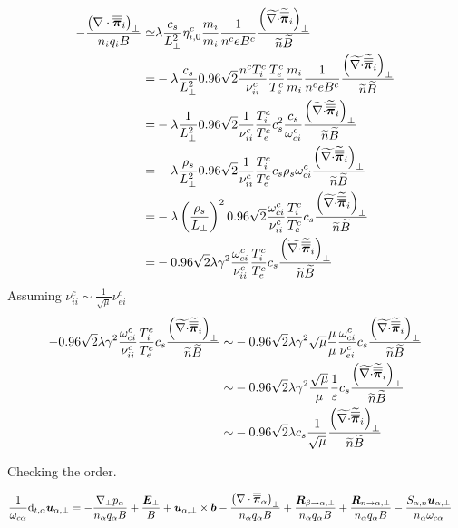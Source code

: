 \begin{align*}
    - \frac{ \left(\nabla\cdot\boldsymbol{\overline{\overline{\pi}}}_i\right)_\perp }{n_i  q_i B}
\simeq&
\lambda
\frac{c_s}{L_{\perp}^2}
\eta^c_{i,0}
\frac{m_i}{m_i}
\frac{1}{n^c  e B^c}
\frac{\left(\widetilde{ \nabla\cdot}\widetilde{ \boldsymbol{\overline{\overline{\pi}}}}_i\right)_\perp}{\widetilde{ n}\widetilde{ B}}
\\
=&
-
\lambda
\frac{c_s}{L_{\perp}^2}
0.96\sqrt{2}\frac{n^cT_i^c}{\nu^c_{ii}}
\frac{T_e^c}{T_e^c}
\frac{m_i}{m_i}
\frac{1}{n^c  e B^c}
\frac{\left(\widetilde{ \nabla\cdot}\widetilde{ \boldsymbol{\overline{\overline{\pi}}}}_i\right)_\perp}{\widetilde{ n}\widetilde{ B}}
\\
=&
-
\lambda
\frac{1}{L_{\perp}^2}
0.96\sqrt{2}\frac{1}{\nu^c_{ii}}
\frac{T_i^c}{T_e^c}
c_s^2
\frac{c_s}{\omega^c_{ci}}
\frac{\left(\widetilde{ \nabla\cdot}\widetilde{ \boldsymbol{\overline{\overline{\pi}}}}_i\right)_\perp}{\widetilde{ n}\widetilde{ B}}
\\
=&
-
\lambda
\frac{\rho_s}{L_{\perp}^2}
0.96\sqrt{2}\frac{1}{\nu^c_{ii}}
\frac{T_i^c}{T_e^c}
c_s\rho_s\omega^c_{ci}
\frac{\left(\widetilde{ \nabla\cdot}\widetilde{ \boldsymbol{\overline{\overline{\pi}}}}_i\right)_\perp}{\widetilde{ n}\widetilde{ B}}
\\
=&
-
\lambda
\left(\frac{\rho_s}{L_{\perp}}\right)^2
0.96\sqrt{2}\frac{\omega^c_{ci}}{\nu^c_{ii}}
\frac{T_i^c}{T_e^c}
c_s
\frac{\left(\widetilde{ \nabla\cdot}\widetilde{ \boldsymbol{\overline{\overline{\pi}}}}_i\right)_\perp}{\widetilde{ n}\widetilde{ B}}
\\
=&
-
0.96\sqrt{2}
\lambda
\gamma^2
\frac{\omega^c_{ci}}{\nu^c_{ii}}
\frac{T_i^c}{T_e^c}
c_s
\frac{\left(\widetilde{ \nabla\cdot}\widetilde{ \boldsymbol{\overline{\overline{\pi}}}}_i\right)_\perp}{\widetilde{ n}\widetilde{ B}}
\end{align*}
%
Assuming $\nu^c_{ii}\sim\frac{1}{\sqrt{\mu}}\nu^c_{ei}$
%
\begin{align*}
-
0.96\sqrt{2}
\lambda
\gamma^2
\frac{\omega^c_{ci}}{\nu^c_{ii}}
\frac{T_i^c}{T_e^c}
c_s
\frac{\left(\widetilde{ \nabla\cdot}\widetilde{ \boldsymbol{\overline{\overline{\pi}}}}_i\right)_\perp}{\widetilde{ n}\widetilde{ B}}
\sim&
-
0.96\sqrt{2}
\lambda
\gamma^2
\sqrt{\mu}
\frac{\mu}{\mu}
\frac{\omega^c_{ci}}{\nu^c_{ei}}
c_s
\frac{\left(\widetilde{ \nabla\cdot}\widetilde{ \boldsymbol{\overline{\overline{\pi}}}}_i\right)_\perp}{\widetilde{ n}\widetilde{ B}}
\\
\sim&
-
0.96\sqrt{2}
\lambda
\gamma^2
\frac{\sqrt{\mu}}{\mu}
\frac{1}{\varepsilon}
c_s
\frac{\left(\widetilde{ \nabla\cdot}\widetilde{ \boldsymbol{\overline{\overline{\pi}}}}_i\right)_\perp}{\widetilde{ n}\widetilde{ B}}
\\
\sim&
-
0.96\sqrt{2}
\lambda
c_s
\frac{1}{\sqrt{\mu}}
\frac{\left(\widetilde{ \nabla\cdot}\widetilde{ \boldsymbol{\overline{\overline{\pi}}}}_i\right)_\perp}{\widetilde{ n}\widetilde{ B}}
\end{align*}
%

Checking the order.


%
\begin{align*}
 \frac{1}{\omega_{c\alpha}}\text{d}_{t,\alpha} \boldsymbol{u}_{\alpha,\perp}
 &=
 -
 \frac{
   \nabla_\perp p_\alpha
 }{n_\alpha  q_\alpha B}
 +
 \frac{\boldsymbol{E}_\perp}{B}
 +
 \boldsymbol{u}_{\alpha,\perp}\times\boldsymbol{b}
 -
  \frac{
   \left(\nabla\cdot\boldsymbol{\overline{\overline{\pi}}}_\alpha\right)_\perp
 }{n_\alpha  q_\alpha B}
 +
 \frac{
   \boldsymbol{R}_{\beta \to \alpha,\perp}
 }{n_\alpha q_\alpha B}
 +
 \frac{
   \boldsymbol{R}_{n \to \alpha,\perp}
 }{n_\alpha q_\alpha B}
 -
 \frac{
     S_{\alpha,n}\boldsymbol{u}_{\alpha,\perp}
 }{n_\alpha \omega_{c\alpha}}
\end{align*}
%





